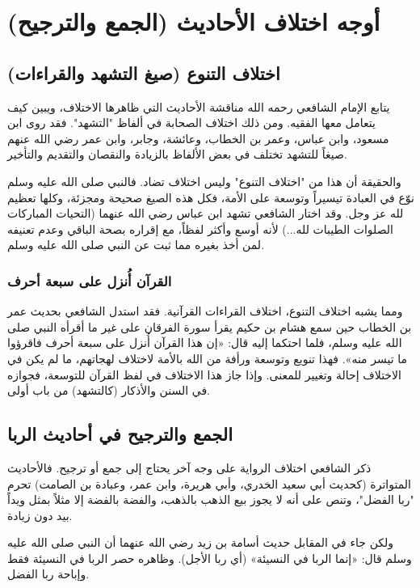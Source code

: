 \chapter{أوجه اختلاف الأحاديث (الجمع والترجيح)}

\section{اختلاف التنوع (صيغ التشهد والقراءات)}
يتابع الإمام الشافعي رحمه الله مناقشة الأحاديث التي ظاهرها الاختلاف، ويبين كيف يتعامل معها الفقيه. ومن ذلك اختلاف الصحابة في ألفاظ "التشهد". فقد روى ابن مسعود، وابن عباس، وعمر بن الخطاب، وعائشة، وجابر، وابن عمر رضي الله عنهم صيغاً للتشهد تختلف في بعض الألفاظ بالزيادة والنقصان والتقديم والتأخير.

والحقيقة أن هذا من "اختلاف التنوع" وليس اختلاف تضاد. فالنبي صلى الله عليه وسلم نوّع في العبادة تيسيراً وتوسعة على الأمة، فكل هذه الصيغ صحيحة ومجزئة، وكلها تعظيم لله عز وجل. وقد اختار الشافعي تشهد ابن عباس رضي الله عنهما (التحيات المباركات الصلوات الطيبات لله...) لأنه أوسع وأكثر لفظاً، مع إقراره بصحة الباقي وعدم تعنيفه لمن أخذ بغيره مما ثبت عن النبي صلى الله عليه وسلم. 

\subsection{القرآن أُنزل على سبعة أحرف}
ومما يشبه اختلاف التنوع، اختلاف القراءات القرآنية. فقد استدل الشافعي بحديث عمر بن الخطاب حين سمع هشام بن حكيم يقرأ سورة الفرقان على غير ما أقرأه النبي صلى الله عليه وسلم، فلما احتكما إليه قال: «إن هذا القرآن أُنزل على سبعة أحرف فاقرؤوا ما تيسر منه». فهذا تنويع وتوسعة ورأفة من الله بالأمة لاختلاف لهجاتهم، ما لم يكن في الاختلاف إحالة وتغيير للمعنى. وإذا جاز هذا الاختلاف في لفظ القرآن للتوسعة، فجوازه في السنن والأذكار (كالتشهد) من باب أولى.

\section{الجمع والترجيح في أحاديث الربا}
ذكر الشافعي اختلاف الرواية على وجه آخر يحتاج إلى جمع أو ترجيح. فالأحاديث المتواترة (كحديث أبي سعيد الخدري، وأبي هريرة، وابن عمر، وعبادة بن الصامت) تحرم "ربا الفضل"، وتنص على أنه لا يجوز بيع الذهب بالذهب، والفضة بالفضة إلا مثلاً بمثل ويداً بيد دون زيادة.

ولكن جاء في المقابل حديث أسامة بن زيد رضي الله عنهما أن النبي صلى الله عليه وسلم قال: «إنما الربا في النسيئة» (أي ربا الأجل). وظاهره حصر الربا في النسيئة فقط وإباحة ربا الفضل.

